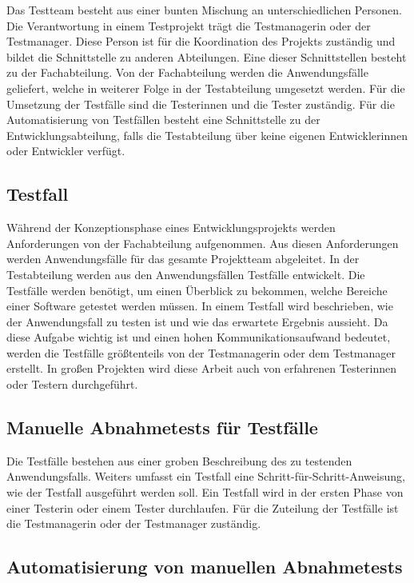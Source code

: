 Das Testteam besteht aus einer bunten Mischung an unterschiedlichen Personen. Die Verantwortung in einem Testprojekt trägt die Testmanagerin oder der Testmanager. Diese Person ist für die Koordination des Projekts zuständig und bildet die Schnittstelle zu anderen Abteilungen. Eine dieser Schnittstellen besteht zu der Fachabteilung. Von der Fachabteilung werden die Anwendungsfälle geliefert, welche in weiterer Folge in der Testabteilung umgesetzt werden. Für die Umsetzung der Testfälle sind die Testerinnen und die Tester zuständig. Für die Automatisierung von Testfällen besteht eine Schnittstelle zu der Entwicklungsabteilung, falls die Testabteilung über keine eigenen Entwicklerinnen oder Entwickler verfügt.

\subsection{Testfall}

Während der Konzeptionsphase eines Entwicklungsprojekts werden Anforderungen von der Fachabteilung aufgenommen. Aus diesen Anforderungen werden Anwendungsfälle für das gesamte Projektteam abgeleitet. In der Testabteilung werden aus den Anwendungsfällen Testfälle entwickelt. Die Testfälle werden benötigt, um einen Überblick zu bekommen, welche Bereiche einer Software getestet werden müssen. In einem Testfall wird beschrieben, wie der Anwendungsfall zu testen ist und wie das erwartete Ergebnis aussieht. Da diese Aufgabe wichtig ist und einen hohen Kommunikationsaufwand bedeutet, werden die Testfälle größtenteils von der Testmanagerin oder dem Testmanager erstellt. In großen Projekten wird diese Arbeit auch von erfahrenen Testerinnen oder Testern durchgeführt. 

\subsection{Manuelle Abnahmetests für Testfälle}

Die Testfälle bestehen aus einer groben Beschreibung des zu testenden Anwendungsfalls. Weiters umfasst ein Testfall eine Schritt-für-Schritt-Anweisung, wie der Testfall ausgeführt werden soll. Ein Testfall wird in der ersten Phase von einer Testerin oder einem Tester durchlaufen. Für die Zuteilung der Testfälle ist die Testmanagerin oder der Testmanager zuständig. 

\subsection{Automatisierung von manuellen Abnahmetests}

